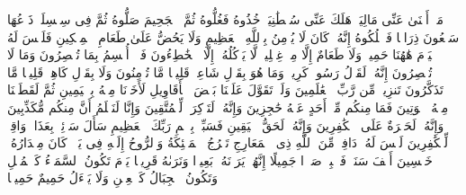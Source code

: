 \startbuffer[\q:69:28]
مَاۤ أَغۡنَىٰ عَنِّی مَالِیَهۡۜ%
\stopbuffer%
\startbuffer[\q:69:29]
هَلَكَ عَنِّی سُلۡطَٰنِیَهۡ%
\stopbuffer%
\startbuffer[\q:69:30]
خُذُوهُ فَغُلُّوهُ%
\stopbuffer%
\startbuffer[\q:69:31]
ثُمَّ ٱلۡجَحِیمَ صَلُّوهُ%
\stopbuffer%
\startbuffer[\q:69:32]
ثُمَّ فِی سِلۡسِلَةࣲ ذَرۡعُهَا سَبۡعُونَ ذِرَاعࣰا فَٱسۡلُكُوهُ%
\stopbuffer%
\startbuffer[\q:69:33]
إِنَّهُۥ كَانَ لَا یُؤۡمِنُ بِٱللَّهِ ٱلۡعَظِیمِ%
\stopbuffer%
\startbuffer[\q:69:34]
وَلَا یَحُضُّ عَلَىٰ طَعَامِ ٱلۡمِسۡكِینِ%
\stopbuffer%
\startbuffer[\q:69:35]
فَلَیۡسَ لَهُ ٱلۡیَوۡمَ هَٰهُنَا حَمِیمࣱ%
\stopbuffer%
\startbuffer[\q:69:36]
وَلَا طَعَامٌ إِلَّا مِنۡ غِسۡلِینࣲ%
\stopbuffer%
\startbuffer[\q:69:37]
لَّا یَأۡكُلُهُۥۤ إِلَّا ٱلۡخَٰطِءُونَ%
\stopbuffer%
\startbuffer[\q:69:38]
فَلَاۤ أُقۡسِمُ بِمَا تُبۡصِرُونَ%
\stopbuffer%
\startbuffer[\q:69:39]
وَمَا لَا تُبۡصِرُونَ%
\stopbuffer%
\startbuffer[\q:69:40]
إِنَّهُۥ لَقَوۡلُ رَسُولࣲ كَرِیمࣲ%
\stopbuffer%
\startbuffer[\q:69:41]
وَمَا هُوَ بِقَوۡلِ شَاعِرࣲۚ قَلِیلࣰا مَّا تُؤۡمِنُونَ%
\stopbuffer%
\startbuffer[\q:69:42]
وَلَا بِقَوۡلِ كَاهِنࣲۚ قَلِیلࣰا مَّا تَذَكَّرُونَ%
\stopbuffer%
\startbuffer[\q:69:43]
تَنزِیلࣱ مِّن رَّبِّ ٱلۡعَٰلَمِینَ%
\stopbuffer%
\startbuffer[\q:69:44]
وَلَوۡ تَقَوَّلَ عَلَیۡنَا بَعۡضَ ٱلۡأَقَاوِیلِ%
\stopbuffer%
\startbuffer[\q:69:45]
لَأَخَذۡنَا مِنۡهُ بِٱلۡیَمِینِ%
\stopbuffer%
\startbuffer[\q:69:46]
ثُمَّ لَقَطَعۡنَا مِنۡهُ ٱلۡوَتِینَ%
\stopbuffer%
\startbuffer[\q:69:47]
فَمَا مِنكُم مِّنۡ أَحَدٍ عَنۡهُ حَٰجِزِینَ%
\stopbuffer%
\startbuffer[\q:69:48]
وَإِنَّهُۥ لَتَذۡكِرَةࣱ لِّلۡمُتَّقِینَ%
\stopbuffer%
\startbuffer[\q:69:49]
وَإِنَّا لَنَعۡلَمُ أَنَّ مِنكُم مُّكَذِّبِینَ%
\stopbuffer%
\startbuffer[\q:69:50]
وَإِنَّهُۥ لَحَسۡرَةٌ عَلَى ٱلۡكَٰفِرِینَ%
\stopbuffer%
\startbuffer[\q:69:51]
وَإِنَّهُۥ لَحَقُّ ٱلۡیَقِینِ%
\stopbuffer%
\startbuffer[\q:69:52]
فَسَبِّحۡ بِٱسۡمِ رَبِّكَ ٱلۡعَظِیمِ%
\stopbuffer%
\startbuffer[\q:70:1]
سَأَلَ سَاۤئِلُۢ بِعَذَابࣲ وَاقِعࣲ%
\stopbuffer%
\startbuffer[\q:70:2]
لِّلۡكَٰفِرِینَ لَیۡسَ لَهُۥ دَافِعࣱ%
\stopbuffer%
\startbuffer[\q:70:3]
مِّنَ ٱللَّهِ ذِی ٱلۡمَعَارِجِ%
\stopbuffer%
\startbuffer[\q:70:4]
تَعۡرُجُ ٱلۡمَلَٰۤئِكَةُ وَٱلرُّوحُ إِلَیۡهِ فِی یَوۡمࣲ كَانَ مِقۡدَارُهُۥ خَمۡسِینَ أَلۡفَ سَنَةࣲ%
\stopbuffer%
\startbuffer[\q:70:5]
فَٱصۡبِرۡ صَبۡرࣰا جَمِیلًا%
\stopbuffer%
\startbuffer[\q:70:6]
إِنَّهُمۡ یَرَوۡنَهُۥ بَعِیدࣰا%
\stopbuffer%
\startbuffer[\q:70:7]
وَنَرَىٰهُ قَرِیبࣰا%
\stopbuffer%
\startbuffer[\q:70:8]
یَوۡمَ تَكُونُ ٱلسَّمَاۤءُ كَٱلۡمُهۡلِ%
\stopbuffer%
\startbuffer[\q:70:9]
وَتَكُونُ ٱلۡجِبَالُ كَٱلۡعِهۡنِ%
\stopbuffer%
\startbuffer[\q:70:10]
وَلَا یَسۡءَلُ حَمِیمٌ حَمِیمࣰا%
